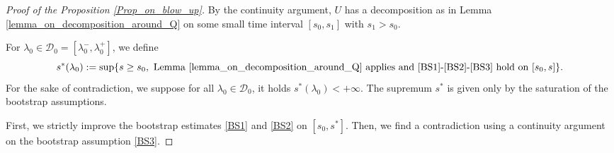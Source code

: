 \documentclass[16pt,english, oneside,reqno]{smfart}
\begin{document}
\vspace{0.4cm}
\begin{proof}[Proof of the Proposition \ref{Prop_on_blow_up}] 
By the continuity argument, $U$ has a decomposition as in Lemma \ref{lemma_on_decomposition_around_Q} on some small time interval $[s_0,s_1]$ with $s_1>s_0$.

For $\lambda_0 \in \mathcal{D}_0=[\lambda_0^-,\lambda_0^+]$, we define
\begin{equation}
    s^*(\lambda_0) :=\sup\{s\geq s_0, \text{ Lemma \ref{lemma_on_decomposition_around_Q}  applies and \eqref{BS1}-\eqref{BS2}-\eqref{BS3} hold on $[s_0,s]$} \}.
\end{equation}
For the sake of contradiction, we suppose for all $\lambda_0 \in \mathcal{D}_0$,
it holds $s^*(\lambda_0)< +\infty$.
The supremum $s^*$ is given only by the saturation of the bootstrap assumptions.


\vspace{0.4cm}
First, we strictly improve the bootstrap estimates \eqref{BS1} and \eqref{BS2} on $[s_0,s^*]$. Then, we find a contradiction using a continuity argument on the bootstrap assumption \eqref{BS3}.


\end{proof}
\end{document}

